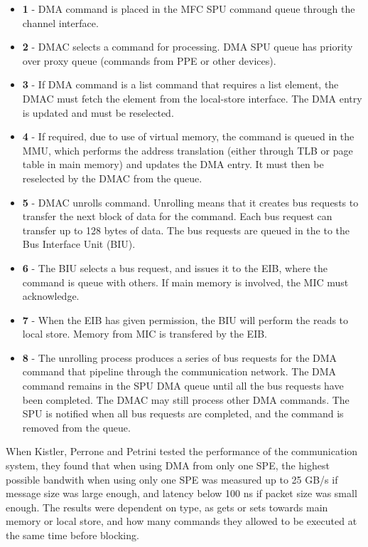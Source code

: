 \begin{itemize}
    \item \textbf{1} - DMA command is placed in the MFC SPU command queue through the channel interface.
    \item \textbf{2} - DMAC selects a command for processing. DMA SPU queue has priority over proxy queue (commands from PPE or other devices).
    \item \textbf{3} - If DMA command is a list command that requires a list element, the DMAC must fetch the element from the local-store interface. 
    The DMA entry is updated and must be reselected.
    \item \textbf{4} - If required, due to use of virtual memory, the command is queued in the MMU, which performs the address translation (either through TLB or page table in main memory) and updates the DMA entry. 
    It must then be reselected by the DMAC from the queue.
    \item \textbf{5} - DMAC unrolls command.
    Unrolling means that it creates bus requests to transfer the next block of data for the command.
    Each bus request can transfer up to 128 bytes of data.
    The bus requests are queued in the to the Bus Interface Unit (BIU).
    \item \textbf{6} - The BIU selects a bus request, and issues it to the EIB, where the command is queue with others.
    If main memory is involved, the MIC must acknowledge.
    \item \textbf{7} - When the EIB has given permission, the BIU will perform the reads to local store.
    Memory from MIC is transfered by the EIB.
    \item \textbf{8} - The unrolling process produces a series of bus requests for the DMA command that pipeline through the communication network.
    The DMA command remains in the SPU DMA queue until all the bus requests have been completed.
    The DMAC may still process other DMA commands.
    The SPU is notified when all bus requests are completed, and the command is removed from the queue. 
\end{itemize}

When Kistler, Perrone and Petrini tested the performance of the communication system, they found that when using DMA from only one SPE, the highest possible bandwith when using only one SPE was measured up to 25 GB/s if message size was large enough, and latency below 100 ns if packet size was small enough.
The results were dependent on type, as gets or sets towards main memory or local store, and how many commands they allowed to be executed at the same time before blocking.
